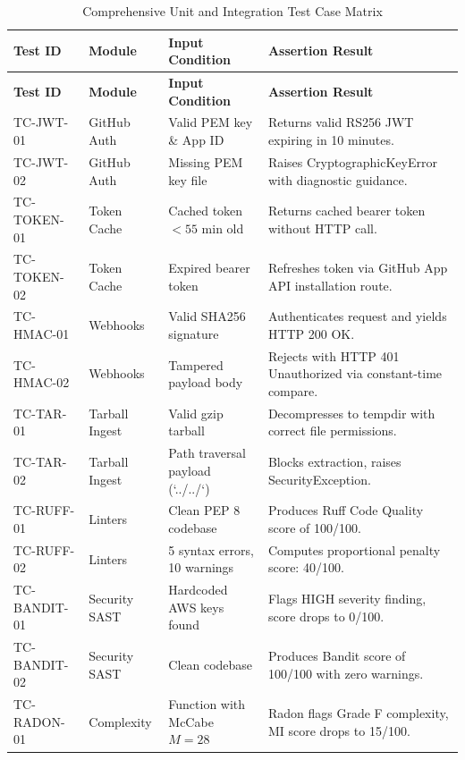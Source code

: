 \begin{longtable}{p{} p{} p{} p{}}
\caption{Comprehensive Unit and Integration Test Case Matrix} \label{tab:app-test-cases} \\
\toprule
\textbf{Test ID} & \textbf{Module} & \textbf{Input Condition} & \textbf{Assertion Result} \\
\midrule
\endfirsthead
\toprule
\textbf{Test ID} & \textbf{Module} & \textbf{Input Condition} & \textbf{Assertion Result} \\
\midrule
\endhead
\bottomrule
\endfoot
\bottomrule
\endlastfoot

TC-JWT-01 & GitHub Auth & Valid PEM key \& App ID & Returns valid RS256 JWT expiring in 10 minutes. \\
\addlinespace
TC-JWT-02 & GitHub Auth & Missing PEM key file & Raises CryptographicKeyError with diagnostic guidance. \\
\addlinespace
TC-TOKEN-01 & Token Cache & Cached token $<55$ min old & Returns cached bearer token without HTTP call. \\
\addlinespace
TC-TOKEN-02 & Token Cache & Expired bearer token & Refreshes token via GitHub App API installation route. \\
\addlinespace
TC-HMAC-01 & Webhooks & Valid SHA256 signature & Authenticates request and yields HTTP 200 OK. \\
\addlinespace
TC-HMAC-02 & Webhooks & Tampered payload body & Rejects with HTTP 401 Unauthorized via constant-time compare. \\
\addlinespace
TC-TAR-01 & Tarball Ingest & Valid gzip tarball & Decompresses to tempdir with correct file permissions. \\
\addlinespace
TC-TAR-02 & Tarball Ingest & Path traversal payload (`../../`) & Blocks extraction, raises SecurityException. \\
\addlinespace
TC-RUFF-01 & Linters & Clean PEP 8 codebase & Produces Ruff Code Quality score of 100/100. \\
\addlinespace
TC-RUFF-02 & Linters & 5 syntax errors, 10 warnings & Computes proportional penalty score: 40/100. \\
\addlinespace
TC-BANDIT-01 & Security SAST & Hardcoded AWS keys found & Flags HIGH severity finding, score drops to 0/100. \\
\addlinespace
TC-BANDIT-02 & Security SAST & Clean codebase & Produces Bandit score of 100/100 with zero warnings. \\
\addlinespace
TC-RADON-01 & Complexity & Function with McCabe $M=28$ & Radon flags Grade F complexity, MI score drops to 15/100. \\

\end{longtable}
